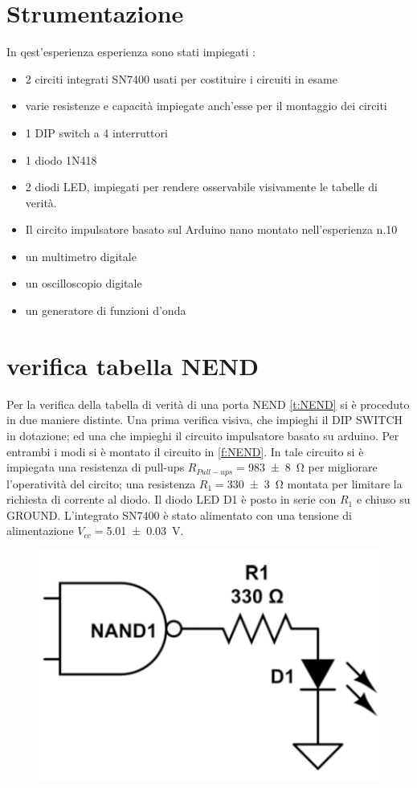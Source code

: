 \section{Strumentazione}
	In qest'esperienza esperienza sono stati impiegati :
	\begin{itemize}
		\item 2 circiti integrati SN7400 usati per costituire i circuiti in esame
		\item varie resistenze e capacità impiegate anch'esse per il montaggio dei circiti
		\item 1 DIP switch a 4 interruttori
		\item 1 diodo 1N418
		\item 2 diodi LED, impiegati per rendere osservabile visivamente le tabelle di verità. 
		\item Il circito impulsatore basato sul Arduino nano montato nell'esperienza n.10
		\item un multimetro digitale
		\item un oscilloscopio digitale 
		\item un generatore di funzioni d'onda
	\end{itemize}

\section{verifica tabella NEND}
	Per la verifica della tabella di verità di una porta NEND 
	\tablename{
		 \ref{t:NEND}
	 }
	si è proceduto in due maniere distinte. Una prima verifica visiva, che impieghi il DIP SWITCH in dotazione; 
	ed una che impieghi il circuito impulsatore basato su arduino.
	Per entrambi i modi si è montato il circuito in \figurename{ \ref{f:NEND}}.
	In tale circuito si è 
	impiegata una resistenza di pull-ups $R_{Pull-ups}=$\SI{983	\pm 8	}{\ohm} per migliorare 
	l'operatività del circito;
	una resistenza $R_{1}=$\SI{330 \pm 3 }{\ohm} montata per  limitare la richiesta di corrente al diodo.
	Il diodo LED D1 è posto in serie con $R_{1}$ e chiuso su GROUND.
	L'integrato  SN7400 è stato alimentato con una tensione di alimentazione $V_{cc}=$\SI{ 5.01 \pm 0.03  }{\volt}.
	\begin{figure}[htb]
		\includegraphics[scale=0.35]{../Figs-Tabs/NEND.png}
	\end{figure}\label{f:NEND}

